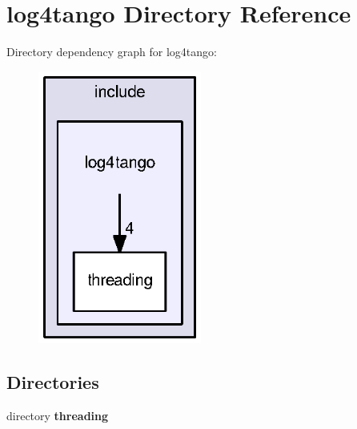 \section{log4tango Directory Reference}
\label{dir_5a719510c01aaeadff0620833443afbe}
Directory dependency graph for log4tango\-:
\nopagebreak
\begin{figure}[H]
\begin{center}
\leavevmode
\includegraphics[width=152pt]{dir_5a719510c01aaeadff0620833443afbe_dep}
\end{center}
\end{figure}
\subsection*{Directories}
\begin{DoxyCompactItemize}
\item 
directory {\bf threading}
\end{DoxyCompactItemize}
